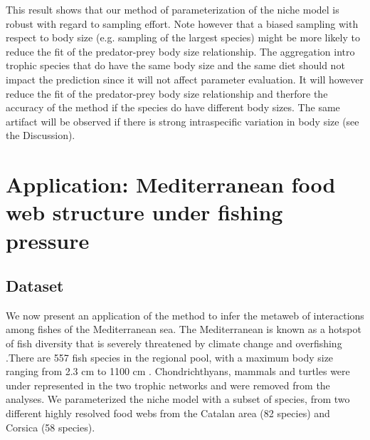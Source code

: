 \documentclass[12pt]{article}
\begin{document}
This result shows that our method of parameterization of the niche model is robust with regard to sampling effort. Note however that a biased sampling with respect to body size (e.g. sampling of the largest species) might be more likely to reduce the fit of the predator-prey body size relationship. The aggregation intro trophic species that do have the same body size and the same diet should not impact the prediction since it will not affect parameter evaluation. It will however reduce the fit of the predator-prey body size relationship and therfore the accuracy of the method if the species do have different body sizes. The same artifact will be observed if there is strong intraspecific variation in body size (see the Discussion). 


\section{Application: Mediterranean food web structure under fishing pressure}
\subsection{Dataset}
We now present an application of the method to infer the metaweb of interactions among fishes of the Mediterranean sea. The Mediterranean is known as a hotspot of fish diversity that is severely threatened by climate change and overfishing \parencite{Mouillot2011}.There are 557 fish species in the regional pool, with a maximum body size ranging from 2.3 cm to 1100 cm \parencite{Whithead1986, Louisy2005, Froese2011}. Chondrichthyans, mammals and turtles were under represented in the two trophic networks and were removed from the analyses. We parameterized the niche model with a subset of species, from two different highly resolved food webs from the Catalan area \parencite{Coll2006} (82 species) and Corsica \parencite{Albouy2010} (58 species). 
\end{document}
